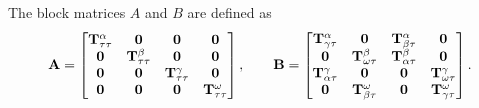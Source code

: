 The block matrices $A$ and $B$ are defined as
\begin{equation}
\textbf{A} = \begin{bmatrix}
\mathbf T^{\alpha}_{\tau\tau} & \mathbf 0 & \mathbf 0 & \mathbf 0 \\
\mathbf 0 & \mathbf T^{\beta}_{\tau\tau} & \mathbf 0 & \mathbf 0  \\
\mathbf 0 & \mathbf 0 & \mathbf T^{\gamma}_{\tau\tau} & \mathbf 0  \\
\mathbf 0& \mathbf 0 & \mathbf 0 & \mathbf T^{\omega}_{\tau\tau} \\
\end{bmatrix}, \qquad
\textbf{B} = \begin{bmatrix}
\mathbf T^{\alpha}_{\gamma\tau} & \mathbf 0              & \mathbf T^{\alpha}_{\beta\tau} & \mathbf 0 \\
\mathbf 0               & \mathbf T^{\beta}_{\omega\tau} & \mathbf T^{\beta}_{\alpha\tau} & \mathbf 0 \\
\mathbf T^{\gamma}_{\alpha\tau} & \mathbf 0              & \mathbf 0              & \mathbf T^{\gamma}_{\omega\tau} \\
\mathbf 0               & \mathbf T^{\omega}_{\beta\tau} & \mathbf 0              & \mathbf T^{\omega}_{\gamma\tau}
\end{bmatrix}.
\label{eq:matrix_AB}
\end{equation}

